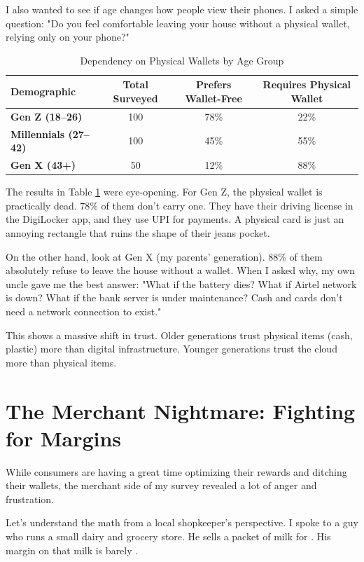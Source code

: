 I also wanted to see if age changes how people view their phones. I asked a simple question: "Do you feel comfortable leaving your house without a physical wallet, relying only on your phone?"

\begin{table}[H]
\centering
\renewcommand{\arraystretch}{1.4}
\begin{tabular}{@{}lccc@{}}
\toprule
\textbf{Demographic} & \textbf{Total Surveyed} & \textbf{Prefers Wallet-Free} & \textbf{Requires Physical Wallet} \\ \midrule
\textbf{Gen Z (18--26)} & 100 & 78\% & 22\% \\
\textbf{Millennials (27--42)} & 100 & 45\% & 55\% \\
\textbf{Gen X (43+)} & 50 & 12\% & 88\% \\ \bottomrule
\end{tabular}
\caption{Dependency on Physical Wallets by Age Group}
\label{tab:wallet_dependency_table}
\end{table}

The results in Table \ref{tab:wallet_dependency_table} were eye-opening. For Gen Z, the physical wallet is practically dead. 78\% of them don't carry one. They have their driving license in the DigiLocker app, and they use UPI for payments. A physical card is just an annoying rectangle that ruins the shape of their jeans pocket.

On the other hand, look at Gen X (my parents' generation). 88\% of them absolutely refuse to leave the house without a wallet. When I asked why, my own uncle gave me the best answer: "What if the battery dies? What if Airtel network is down? What if the bank server is under maintenance? Cash and cards don't need a network connection to exist."

This shows a massive shift in trust. Older generations trust physical items (cash, plastic) more than digital infrastructure. Younger generations trust the cloud more than physical items.

\section{The Merchant Nightmare: Fighting for Margins}

While consumers are having a great time optimizing their rewards and ditching their wallets, the merchant side of my survey revealed a lot of anger and frustration.

Let's understand the math from a local shopkeeper's perspective. I spoke to a guy who runs a small dairy and grocery store. He sells a packet of milk for . His margin on that milk is barely .

